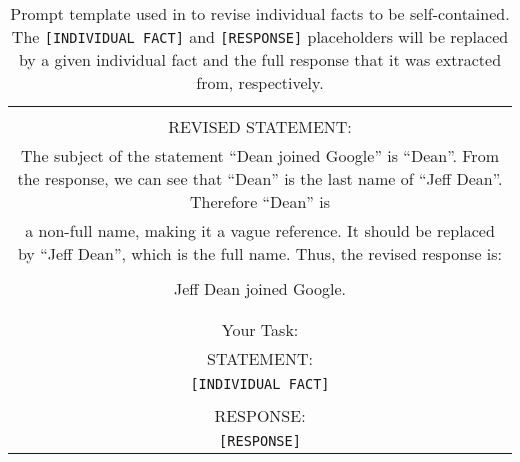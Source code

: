 \begin{table}[th]
\begin{tabular}{c}
{            \\
            REVISED STATEMENT:\\
            The subject of the statement ``Dean joined Google'' is ``Dean''. From the response, we can see that ``Dean'' is the last name of ``Jeff Dean''. Therefore ``Dean'' is\\a non-full name, making it a vague reference. It should be replaced by ``Jeff Dean'', which is the full name. Thus, the revised response is:\\
            \codeblock{}\\
            Jeff Dean joined Google.\\
            \codeblock{}\\
            \\
            Your Task:\\
            STATEMENT:\\
            \texttt{[INDIVIDUAL FACT]}\\
            \\
            RESPONSE:\\
            \texttt{[RESPONSE]}
        } \\
        \bottomrule
    \end{tabular}
    \vspace{-1mm}
    \caption{
    Prompt template used in \safe{} to revise individual facts to be self-contained.
    The \texttt{[INDIVIDUAL FACT]} and \texttt{[RESPONSE]} placeholders will be replaced by a given individual fact and the full response that it was extracted from, respectively.
    }
    \label{tab:safe-self-containment-prompt-template}
\end{table}